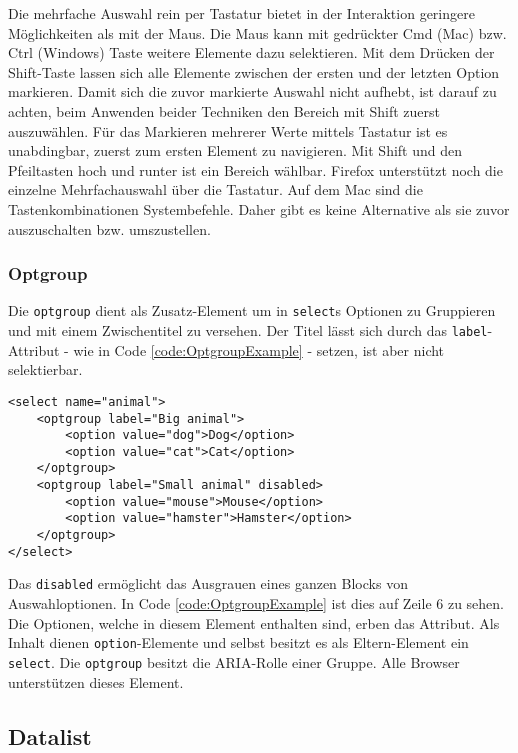 Die mehrfache Auswahl rein per Tastatur bietet in der Interaktion geringere Möglichkeiten als mit der Maus.
Die Maus kann mit gedrückter Cmd (Mac) bzw. Ctrl (Windows) Taste weitere Elemente dazu selektieren.
Mit dem Drücken der Shift-Taste lassen sich alle Elemente zwischen der ersten und der letzten Option markieren.
Damit sich die zuvor markierte Auswahl nicht aufhebt, ist darauf zu achten, beim Anwenden beider Techniken den Bereich mit Shift zuerst auszuwählen.
Für das Markieren mehrerer Werte mittels Tastatur ist es unabdingbar, zuerst zum ersten Element zu navigieren.
Mit Shift und den Pfeiltasten hoch und runter ist ein Bereich wählbar.
Firefox unterstützt noch die einzelne Mehrfachauswahl über die Tastatur.
Auf dem Mac sind die Tastenkombinationen Systembefehle.
Daher gibt es keine Alternative als sie zuvor auszuschalten bzw. umszustellen.


\subsubsection{\color{dgray} Optgroup}
\label{sec:optgroup}

Die \texttt{optgroup} dient als Zusatz-Element um in \texttt{select}s Optionen zu Gruppieren und mit einem Zwischentitel zu versehen.
Der Titel lässt sich durch das \texttt{label}-Attribut - wie in Code \ref{code:OptgroupExample} - setzen, ist aber nicht selektierbar. 

\begin{lstlisting}[style = htmlcssjs, caption = Optgroup Example, label = code:OptgroupExample]
<select name="animal">
    <optgroup label="Big animal">
        <option value="dog">Dog</option>
        <option value="cat">Cat</option>
    </optgroup>
    <optgroup label="Small animal" disabled>
        <option value="mouse">Mouse</option>
        <option value="hamster">Hamster</option>
    </optgroup>
</select>
\end{lstlisting}

Das \texttt{disabled} ermöglicht das Ausgrauen eines ganzen Blocks von Auswahloptionen.
In Code \ref{code:OptgroupExample} ist dies auf Zeile 6 zu sehen.
Die Optionen, welche in diesem Element enthalten sind, erben das Attribut.
Als Inhalt dienen \texttt{option}-Elemente und selbst besitzt es als Eltern-Element ein \texttt{select}.
Die \texttt{optgroup} besitzt die ARIA-Rolle einer Gruppe.
Alle Browser unterstützen dieses Element.


\subsection{Datalist}
\label{sec:datalist}


